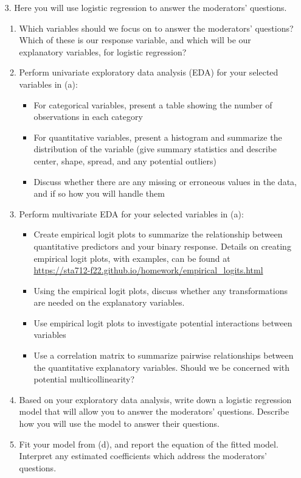 \documentclass[11pt]{article}
\begin{document}
\begin{enumerate}
\item[3.] Here you will use logistic regression to answer the moderators' questions.

\begin{enumerate}
\item Which variables should we focus on to answer the moderators' questions? Which of these is our response variable, and which will be our explanatory variables, for logistic regression?
\item Perform univariate exploratory data analysis (EDA) for your selected variables in (a): 
\begin{itemize}
\item For categorical variables, present a table showing the number of observations in each category
\item For quantitative variables, present a histogram and summarize the distribution of the variable (give summary statistics and describe center, shape, spread, and any potential outliers)
\item Discuss whether there are any missing or erroneous values in the data, and if so how you will handle them
\end{itemize}
\item Perform multivariate EDA for your selected variables in (a):
\begin{itemize}
\item Create empirical logit plots to summarize the relationship between quantitative predictors and your binary response. Details on creating empirical logit plots, with examples, can be found at\\ \url{https://sta712-f22.github.io/homework/empirical_logits.html}
\item Using the empirical logit plots, discuss whether any transformations are needed on the explanatory variables.
\item Use empirical logit plots to investigate potential interactions between variables
\item Use a correlation matrix to summarize pairwise relationships between the quantitative explanatory variables. Should we be concerned with potential multicollinearity?
\end{itemize}
\item Based on your exploratory data analysis, write down a logistic regression model that will allow you to answer the moderators' questions. Describe how you will use the model to answer their questions.
\item Fit your model from (d), and report the equation of the fitted model. Interpret any estimated coefficients which address the moderators' questions.

\end{enumerate}
\end{enumerate}
\end{document}
